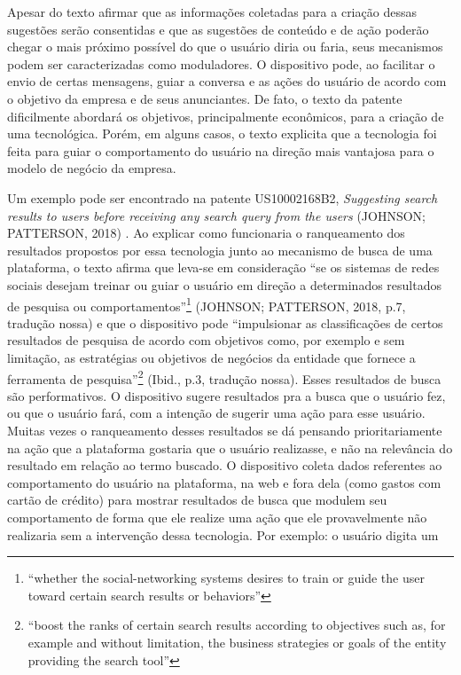 Apesar do texto afirmar que as informações coletadas para a criação
dessas sugestões serão consentidas e que as sugestões de conteúdo e de
ação poderão chegar o mais próximo possível do que o usuário diria ou
faria, seus mecanismos podem ser caracterizadas como moduladores. O
dispositivo pode, ao facilitar o envio de certas mensagens, guiar a
conversa e as ações do usuário de acordo com o objetivo da empresa e de
seus anunciantes. De fato, o texto da patente dificilmente abordará os
objetivos, principalmente econômicos, para a criação de uma tecnológica.
Porém, em alguns casos, o texto explicita que a tecnologia foi feita
para guiar o comportamento do usuário na direção mais vantajosa para o
modelo de negócio da empresa.

Um exemplo pode ser encontrado na patente US10002168B2, \emph{Suggesting
search results to users before receiving any search query from the
users} (JOHNSON; PATTERSON, 2018) . Ao explicar como funcionaria o
ranqueamento dos resultados propostos por essa tecnologia junto ao
mecanismo de busca de uma plataforma, o texto afirma que leva-se em
consideração ``se os sistemas de redes sociais desejam treinar ou guiar
o usuário em direção a determinados resultados de pesquisa ou
comportamentos''\footnote{``whether the social-networking systems
  desires to train or guide the user toward certain search results or
  behaviors''} (JOHNSON; PATTERSON, 2018, p.7, tradução nossa) e que o
dispositivo pode ``impulsionar as classificações de certos resultados de
pesquisa de acordo com objetivos como, por exemplo e sem limitação, as
estratégias ou objetivos de negócios da entidade que fornece a
ferramenta de pesquisa''\footnote{``boost the ranks of certain search
  results according to objectives such as, for example and without
  limitation, the business strategies or goals of the entity providing
  the search tool''} (Ibid., p.3, tradução nossa). Esses resultados de
busca são performativos. O dispositivo sugere resultados pra a busca que
o usuário fez, ou que o usuário fará, com a intenção de sugerir uma ação
para esse usuário. Muitas vezes o ranqueamento desses resultados se dá
pensando prioritariamente na ação que a plataforma gostaria que o
usuário realizasse, e não na relevância do resultado em relação ao termo
buscado. O dispositivo coleta dados referentes ao comportamento do
usuário na plataforma, na web e fora dela (como gastos com cartão de
crédito) para mostrar resultados de busca que modulem seu comportamento
de forma que ele realize uma ação que ele provavelmente não realizaria
sem a intervenção dessa tecnologia. Por exemplo: o usuário digita um
